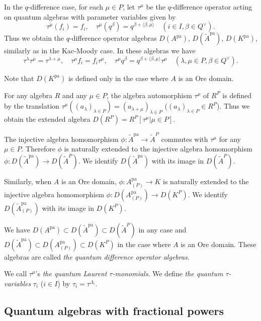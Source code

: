 \documentclass[12pt,twoside]{article}
\newcommand\bra{\langle}
\newcommand\ket{\rangle}
\newcommand\Qv{Q^\vee}
\newcommand\tA{{\widetilde A}}
\newcommand\pa{{\mathrm{pa}}}
\theoremstyle{plain} %
\theoremstyle{definition} %
\theoremstyle{definition} %
\numberwithin{theorem}{section}
\numberwithin{equation}{section}
\numberwithin{figure}{section}
\numberwithin{table}{section}
\begin{document}
In the $q$-difference case, 
for each $\mu\in P$, let $\tau^\mu$ be the $q$-difference operator 
acting on quantum algebras with parameter variables given by
\begin{equation*}
 \tau^\mu(f_i) = f_i, \quad
 \tau^\mu(q^\beta) = q^{\beta+\bra\beta,\mu\ket} \quad
 (i\in I, \beta\in\Qv).
\end{equation*}
Thus we obtain the $q$-difference operator algebras 
$D(A^\pa)$, $D(\tA^\pa)$, $D(K^\pa)$, 
similarly as in the Kac-Moody case.
In these algebras we have
\begin{equation*}
 \tau^\lambda\tau^\mu=\tau^{\lambda+\mu}, \quad
 \tau^\mu f_i = f_i\tau^\mu, \quad
 \tau^\mu q^\beta = q^{\beta+\bra\beta,\mu\ket}\tau^\mu \quad
 (\lambda,\mu\in P, \beta\in\Qv).
\end{equation*}

Note that $D(K^\pa)$ is defined only in the case where $A$ is an Ore domain.

For any algebra $R$ and any $\mu\in P$, 
the algebra automorphism $\tau^\mu$ of $R^P$ is 
defined by the translation \(
 \tau^\mu((a_\lambda)_{\lambda\in P}) =
 (a_{\lambda+\mu})_{\lambda\in P}
\) ($(a_\lambda)_{\lambda\in P}\in R^P$).
Thus we obtain the extended algebra $D(R^P)=R^P[\tau^\mu|\mu\in P]$.

The injective algebra homomorphism $\phi:\tA^\pa\to\tA^P$
commutes with $\tau^\mu$ for any $\mu\in P$.
Therefore $\phi$ is naturally extended to
the injective algebra homomorphism $\phi:D(\tA^\pa)\to D(\tA^P)$.
We identify $D(\tA^\pa)$ with its image in $D(\tA^P)$.

Similarly, when $A$ is an Ore domain, $\phi:A^\pa_{(P)}\to K$ is
naturally extended to
the injective algebra homomorphism $\phi:D(A^\pa_{(P)})\to D(K^P)$.
We identify $D(\tA^\pa_{(P)})$ with its image in $D(K^P)$.

We have $D(A^\pa)\subset D(\tA^\pa)\subset D(\tA^P)$ in any case
and $D(\tA^\pa)\subset D(A^\pa_{(P)})\subset D(K^P)$ 
in the case where $A$ is an Ore domain.
These algebras are called {\em the quantum difference operator algebras}.

We call $\tau^\mu$'s {\em the quantum Laurent $\tau$-monomials}.
We define {\em the quantum $\tau$-variables} $\tau_i$ ($i\in I$) 
by $\tau_i=\tau^{\Lambda_i}$.


\subsection{Quantum algebras with fractional powers}
\label{sec:f^beta}
\end{document}
